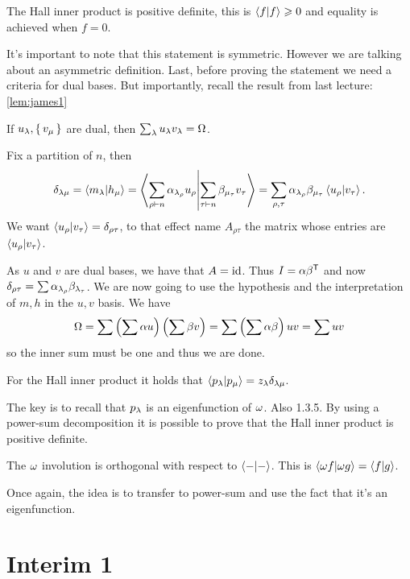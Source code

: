 \documentclass[12pt]{memoir}
\begin{document}
\begin{Th}
    The Hall inner product is positive definite, this is $\braket{f}{f}\geqslant 0$ and equality is achieved when $f=0$.
\end{Th}

It's important to note that this statement is symmetric. However we are talking about an asymmetric definition. Last, before proving the statement we need a criteria for dual bases. But importantly, recall the result from last lecture: \ref{lem:james1}

\begin{Th}
    If ${u_\lambda},\{\,v_\mu\,\}$ are dual, then $\sum_\lambda u_\lambda v_\lambda=\Omega$. 
\end{Th}

\begin{ptcbp}
    Fix a partition of $n$, then 
    $$\delta_{\lambda\mu}=\braket{m_\lambda}{h_\mu}=\braket{\sum_{\rho\vdash n}\alpha_{\lambda_\rho}u_\rho}{\sum_{\tau\vdash n}\beta_{\mu_\tau}v_\tau}=\sum_{\rho,\tau}\alpha_{\lambda_\rho}\beta_{\mu_\tau}\braket{u_\rho}{v_\tau}.$$
    We want $\braket{u_\rho}{v_\tau}=\delta_{\rho\tau}$, to that effect name $A_{\rho\tau}$ the matrix whose entries are $\braket{u_\rho}{v_\tau}$.\par 
    As $u$ and $v$ are dual bases, we have that $A=\operatorname{id}$. Thus $I=\alpha\beta^{\mathsf{T}}$ and now $\delta_{\rho\tau}=\sum \alpha_{\lambda_\rho}\beta_{\lambda_\tau}$. We are now going to use the hypothesis and the interpretation of $m,h$ in the $u,v$ basis. We have 
    $$\Omega=\sum\left(\sum\alpha u\right)\left(\sum\beta v\right)=\sum\left(\sum \alpha\beta\right)uv=\sum uv$$
    so the inner sum must be one and thus we are done. 
\end{ptcbp}

\begin{Cor}
    For the Hall inner product it holds that $\braket{p_\lambda}{p_\mu}=z_\lambda\delta_{\lambda\mu}$.
\end{Cor}

The key is to recall that $p_\lambda$ is an eigenfunction of $\omega$. Also 1.3.5. By using a power-sum decomposition it is possible to prove that the Hall inner product is positive definite.

\begin{Cor}
    The $\omega$ involution is orthogonal with respect to $\braket{-}{-}$. This is $\braket{\omega f}{\omega g}=\braket{f}{g}$. 
\end{Cor}
 
Once again, the idea is to transfer to power-sum and use the fact that it's an eigenfunction.

\section{Interim 1}
\end{document}
